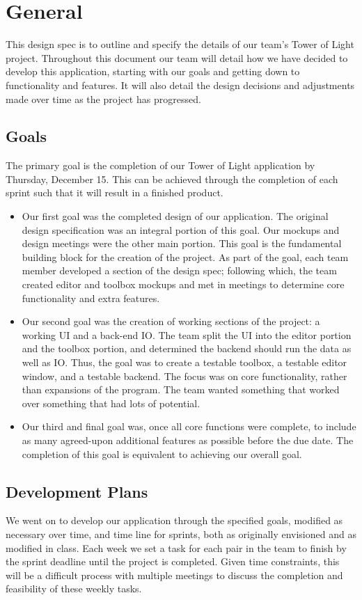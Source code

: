 \documentclass{article}
\begin{document}
\section{General}
This design spec is to outline and specify the details of our team's Tower of Light project. Throughout this document our team will detail how we have decided to develop this application, starting with our goals and getting down to functionality and features.  It will also detail the design decisions and adjustments made over time as the project has progressed.

\subsection{Goals}
The primary goal is the completion of our Tower of Light application by Thursday, December 15. This can be achieved through the completion of  each sprint such that it will result in a finished product.
	\begin{itemize}
		\item Our first goal was the completed design of our application. The original design specification was an integral portion of this goal.  Our mockups and design meetings were the other main portion.  This goal is the fundamental building block for the creation of the project.  As part of the goal, each team member developed a section of the design spec; following which, the team created editor and toolbox mockups and met in meetings to determine core functionality and extra features.
		\item Our second goal was the creation of working sections of the project: a working UI and a back-end IO.  The team split the UI into the editor portion and the toolbox portion, and determined the backend should run the data as well as IO.  Thus, the goal was to create a testable toolbox, a testable editor window, and a testable backend.  The focus was on core functionality, rather than expansions of the program.  The team wanted something that worked over something that had lots of potential.
		\item Our third and final goal was, once all core functions were complete, to include as many agreed-upon additional features as possible before the due date. The completion of this goal is equivalent to achieving our overall goal.  
	\end{itemize}
\subsection{Development Plans}
We went on to develop our application through the specified goals, modified as necessary over time, and time line for sprints, both as originally envisioned and as modified in class. Each week we set a task for each pair in the team to finish by the sprint deadline until the project is completed. Given time constraints, this will be a difficult process with multiple meetings to discuss the completion and feasibility of these weekly tasks. 
\end{document}
